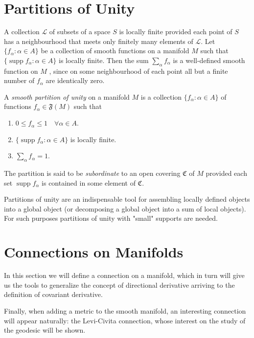 \section{Partitions of Unity}
\label{sec:partitionunity}

A collection $\mathcal{L}$ of subsets of a space $S$ is locally finite provided each point of $S$ has a neighbourhood that meets only finitely many elements of $\mathcal{L}$. Let $\{f_\alpha \colon \alpha \in A\}$ be a collection of smooth functions on a manifold $M$ such that $\{\operatorname{supp} f_\alpha \colon \alpha \in A\}$ is locally finite. Then the sum $\sum_\alpha f_\alpha$ is a well-defined smooth function on $M$ , since on some neighbourhood of each point all but a finite number of $f_\alpha$ are identically zero.

\begin{definition}
	A \emph{smooth partition of unity} on a manifold $M$ is a collection $\{f_\alpha \colon \alpha \in A\}$ of functions $f_\alpha \in \mathfrak{F}(M)$ such that
	\begin{enumerate}
		\item $0 \leq f_\alpha \leq 1 \quad \forall \alpha \in A$.
		\item $\{\operatorname{supp} f_\alpha \colon \alpha \in A\}$ is locally finite.
		\item $\sum_\alpha f_\alpha = 1$.
	\end{enumerate}

	The partition is said to be \emph{subordinate} to an open covering $\mathfrak{C}$ of $M$ provided each set $\operatorname{supp} f_\alpha$ is contained in some element of $\mathfrak{C}$.
\end{definition}

Partitions of unity are an indispensable tool for assembling locally defined  objects into a global object (or decomposing a global object into a sum of local objects). For such purposes  partitions of unity with "small" supports are needed.


\section{Connections on Manifolds}

In this section we will define a connection on a manifold, which in turn will give us the tools to generalize the concept of directional derivative arriving to the definition of covariant derivative.

Finally, when adding a metric to the smooth manifold, an interesting connection will appear naturally: the Levi-Civita connection, whose interest on the study of the geodesic will be shown.

